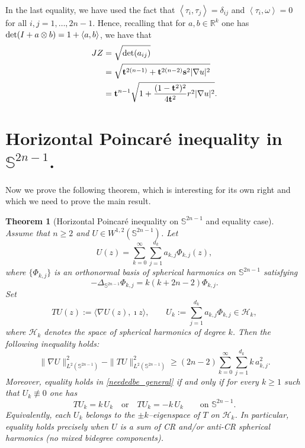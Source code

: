 \documentclass[11pt]{amsart}
\newtheorem{theorem}{Theorem}[section]
\def\det{{\rm det}}
\numberwithin{equation}{section}
\def\ge{\geqslant}
\begin{document}
In the last equality, we have used the fact that $\left<\tau_i,  \tau_j\right> = \delta_{ij}$ and $\left<\tau_i,\omega\right> = 0$ for all $i, j = 1, \dots, 2n-1$. Hence, recalling that for $a, b \in \mathbb{R}^k$ one has $\det(I + a \otimes b) = 1 + \left<a , b\right>$, we have that
\[\begin{split}
J Z &= \sqrt{\det(a_{ij})} \\&= \sqrt{\mathbf{t}^{2(n-1)} + \mathbf{t}^{2(n-2)}\mathbf{s}^2|\nabla u|^2}\\&=\mathbf{t}^{n-1}\sqrt{1 + \frac{(1-\mathbf{t}^2)^2}{4\mathbf{t}^2} r^2|\nabla u|^2}.\end{split}
\]
\section{Horizontal Poincar\'e inequality in $\mathbb{S}^{2n-1}$.}\label{ksec}
Now we prove the following theorem, which is interesting for its own right and  which we need to prove the main result.



\begin{theorem}[Horizontal Poincar\'e inequality on $\mathbb S^{2n-1}$ and equality case]\label{prop23_general}
Assume that $n\ge 2$ and $U\in W^{1,2}(\mathbb{S}^{2n-1})$. Let
\[
U(z)=\sum_{k=0}^\infty\sum_{j=1}^{d_k} a_{k,j}\Phi_{k,j}(z),
\]
where $\{\Phi_{k,j}\}$ is an orthonormal basis of spherical harmonics on
$\mathbb S^{2n-1}$ satisfying
\[
-\Delta_{\mathbb S^{2n-1}}\Phi_{k,j}=k(k+2n-2)\Phi_{k,j}.
\]
Set
\[
TU(z):=\langle \nabla U(z),\imath z\rangle,
\qquad
U_k:=\sum_{j=1}^{d_k} a_{k,j}\Phi_{k,j}\in\mathcal H_k,
\]
where $\mathcal H_k$ denotes the space of spherical harmonics of degree $k$.
Then the following inequality holds:
\begin{equation}\label{neededbe_general}
\|\nabla U\|_{L^2(\mathbb S^{2n-1})}^2
-\|TU\|_{L^2(\mathbb S^{2n-1})}^2
\ge (2n-2)\sum_{k=0}^\infty\sum_{j=1}^{d_k} k\,a_{k,j}^2.
\end{equation}
Moreover, equality holds in \eqref{neededbe_general} if and only if for every $k\ge 1$
such that $U_k\not\equiv 0$ one has
\begin{equation}\label{eq:equality_condition_T}
TU_k = k\,U_k \quad \text{or}\quad TU_k = -k\,U_k
\qquad \text{on }\mathbb S^{2n-1}.
\end{equation}
Equivalently, each $U_k$ belongs to the $\pm k$--eigenspace of $T$ on $\mathcal H_k$.
In particular, equality holds precisely when $U$ is a sum of CR and/or anti-CR spherical
harmonics (no mixed bidegree components).
\end{theorem}
\end{document}

